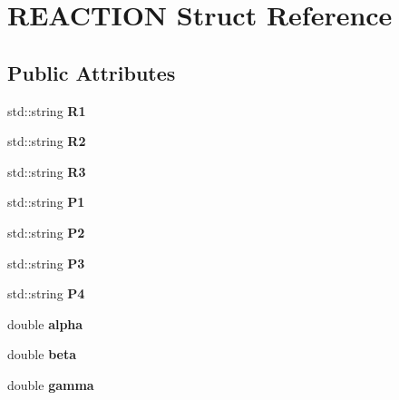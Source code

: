 \hypertarget{structREACTION}{}\section{R\+E\+A\+C\+T\+I\+ON Struct Reference}
\label{structREACTION}
\subsection*{Public Attributes}
\begin{DoxyCompactItemize}
\item 
\mbox{\label{structREACTION_a06a30472d6e104e0b57d32fdf4a319a4}} 
std\+::string {\bfseries R1}
\item 
\mbox{\label{structREACTION_aa5384b1258e1a65d573e855309919a28}} 
std\+::string {\bfseries R2}
\item 
\mbox{\label{structREACTION_a1e59aa64e9bad97b6899dc5df60b0cfd}} 
std\+::string {\bfseries R3}
\item 
\mbox{\label{structREACTION_a042334cea9a5bec349a8ea28aedd030c}} 
std\+::string {\bfseries P1}
\item 
\mbox{\label{structREACTION_ac4298c51d6db3c6de69addb1b1c5861e}} 
std\+::string {\bfseries P2}
\item 
\mbox{\label{structREACTION_ae96feed8788038b3d32c6f362fcabc2e}} 
std\+::string {\bfseries P3}
\item 
\mbox{\label{structREACTION_a35958505f2492046955c07d16128be94}} 
std\+::string {\bfseries P4}
\item 
\mbox{\label{structREACTION_ad309bd811e54b13146e1e1162037281e}} 
double {\bfseries alpha}
\item 
\mbox{\label{structREACTION_a88f1992325683a827534bd12045e4ed3}} 
double {\bfseries beta}
\item 
\mbox{\label{structREACTION_ace5b654ed043dd939eb45f56376152e4}} 
double {\bfseries gamma}
\item 

\end{DoxyCompactItemize}
